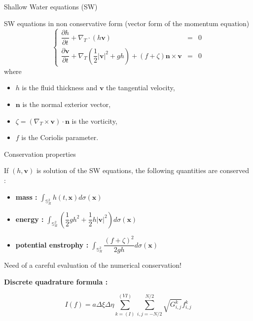 \documentclass[11pt]{beamer}
\def\gint{\displaystyle\int}
\begin{document}
\begin{frame}{Shallow Water equations (SW)}
\begin{block}{SW equations in non conservative form (vector form of the momentum equation)}
\begin{equation}
\left\lbrace
\begin{array}{rcl}
\dfrac{\partial h}{\partial t} + \nabla_T \cdot \left( h \mathbf{v} \right) & = & 0 \\
\dfrac{\partial \mathbf{v}}{\partial t} + \nabla_T \left( \dfrac{1}{2}|\mathbf{v}|^2 + gh \right) + \left( f + \zeta \right) \mathbf{n} \times \mathbf{v} & = & 0
\end{array}
\right.
\end{equation}
where 
\begin{itemize}
\item $h$ is the fluid thickness and $\mathbf{v}$ the tangential velocity,
\item $\mathbf{n}$ is the normal exterior vector, 
\item $\zeta = \left( \nabla_T \times \mathbf{v} \right) \cdot \mathbf{n}$ is the vorticity,
\item $f$ is the Coriolis parameter.
\end{itemize}
\end{block}
\end{frame}


\begin{frame}{Conservation properties}
\begin{block}{}
If $(h, \mathbf{v})$ is solution of the SW equations, the following quantities are conserved :

\begin{itemize}
\item \textbf{mass :} 
$\gint_{\mathbb{S}^2_R} h(t, \mathbf{x}) d \sigma(\mathbf{x})$
\item \textbf{energy :}
$ \gint_{\mathbb{S}^2_R} \left( \dfrac{1}{2}gh^2 + \dfrac{1}{2} h | \mathbf{v} |^2 \right) d \sigma(\mathbf{x})$
\item \textbf{potential enstrophy :}
$\gint_{\mathbb{S}^2_R} \dfrac{\left( f + \zeta \right)^2}{2gh} d \sigma(\mathbf{x})$
\end{itemize}
\end{block}

Need of a careful evaluation of the numerical conservation!

\textbf{Discrete quadrature formula :}

$$I(f) = a \Delta \xi \Delta \eta   \sum_{k=(I)}^{(VI)} \sum_{i,j=-N/2}^{N/2}  \sqrt{G_{i,j}^k} f_{i,j}^{k} $$

\end{frame}
\end{document}
